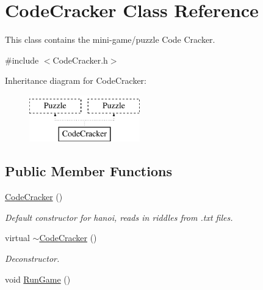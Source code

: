 \hypertarget{classCodeCracker}{\section{Code\-Cracker Class Reference}
\label{classCodeCracker}
}


This class contains the mini-\/game/puzzle Code Cracker.  




{\ttfamily \#include $<$Code\-Cracker.\-h$>$}

Inheritance diagram for Code\-Cracker\-:\begin{figure}[H]
\begin{center}
\leavevmode
\includegraphics[height=2.000000cm]{classCodeCracker}
\end{center}
\end{figure}
\subsection*{Public Member Functions}
\begin{DoxyCompactItemize}
\item 
\hyperlink{classCodeCracker_a46b5ec438efd38104b9a406b45c8cd68}{Code\-Cracker} ()
\begin{DoxyCompactList}\small\item\em Default constructor for hanoi, reads in riddles from .txt files. \end{DoxyCompactList}\item 
virtual \hyperlink{classCodeCracker_ab63ac3b41d3f24eb774ab92ddb11f976}{$\sim$\-Code\-Cracker} ()
\begin{DoxyCompactList}\small\item\em Deconstructor. \end{DoxyCompactList}\item 
void \hyperlink{classCodeCracker_a4f2aaaf60b31cf33cc0d70622665be45}{Run\-Game} ()
\end{DoxyCompactItemize}
